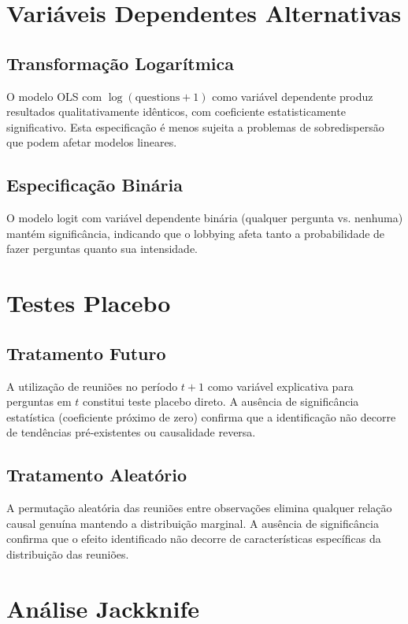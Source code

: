 \section{Variáveis Dependentes Alternativas}

\subsection{Transformação Logarítmica}

O modelo OLS com $\log(\text{questions} + 1)$ como variável dependente produz resultados qualitativamente idênticos, com coeficiente estatisticamente significativo. Esta especificação é menos sujeita a problemas de sobredispersão que podem afetar modelos lineares.

\subsection{Especificação Binária}

O modelo logit com variável dependente binária (qualquer pergunta vs. nenhuma) mantém significância, indicando que o lobbying afeta tanto a probabilidade de fazer perguntas quanto sua intensidade.

\section{Testes Placebo}

\subsection{Tratamento Futuro}

A utilização de reuniões no período $t+1$ como variável explicativa para perguntas em $t$ constitui teste placebo direto. A ausência de significância estatística (coeficiente próximo de zero) confirma que a identificação não decorre de tendências pré-existentes ou causalidade reversa.

\subsection{Tratamento Aleatório}

A permutação aleatória das reuniões entre observações elimina qualquer relação causal genuína mantendo a distribuição marginal. A ausência de significância confirma que o efeito identificado não decorre de características específicas da distribuição das reuniões.

\section{Análise Jackknife}

